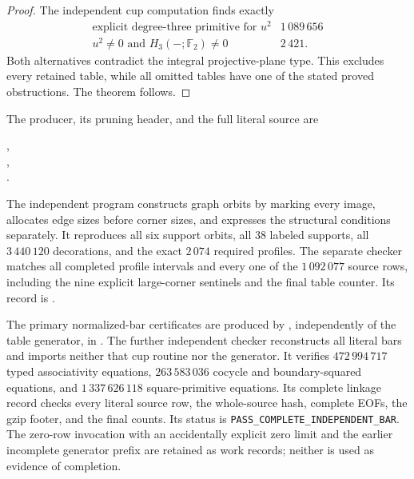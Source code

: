 \begin{proof}
The independent cup computation finds exactly
\[
\begin{array}{l|r}
\text{explicit degree-three primitive for }u^2&1\,089\,656\\
u^2\ne0\text{ and }H_3(-;\mathbb F_2)\ne0&2\,421.
\end{array}
\]
Both alternatives contradict the integral projective-plane type.
This excludes every retained table, while all omitted tables have
one of the stated proved obstructions.  The theorem follows.
\end{proof}

\begin{remark}
\label{C:sixteen-four-verification}
The producer, its pruning header, and the full literal source are
\begin{center}\small
{},\\
,\\
.
\end{center}
The independent program 
constructs graph orbits by marking every image, allocates edge
sizes before corner sizes, and expresses the structural conditions
separately.  It reproduces all six support orbits, all $38$ labeled
supports, all $3\,440\,120$ decorations, and the exact $2\,074$
required profiles.  The separate checker
 matches all completed
profile intervals and every one of the $1\,092\,077$ source rows,
including the nine explicit large-corner sentinels and the final
table counter.  Its record is
.

The primary normalized-bar certificates are produced by
, independently of the table
generator, in
.
The further independent checker
 reconstructs all literal
bars and imports neither that cup routine nor the generator.
It verifies $472\,994\,717$ typed associativity equations,
$263\,583\,036$ cocycle and boundary-squared equations, and
$1\,337\,626\,118$ square-primitive equations.
Its complete linkage record
 checks every
literal source row, the whole-source hash, complete EOFs, the gzip
footer, and the final counts.  Its status is
\texttt{PASS\_COMPLETE\_INDEPENDENT\_BAR}.
The zero-row invocation with an accidentally explicit zero limit
and the earlier incomplete generator prefix are retained as work
records; neither is used as evidence of completion.
\end{remark}
